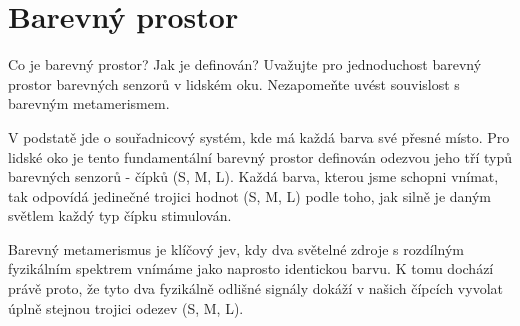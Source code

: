 \section{Barevný prostor}
Co je barevný prostor? Jak je definován? Uvažujte pro jednoduchost barevný prostor barevných senzorů v lidském 
oku. Nezapomeňte uvést souvislost s barevným metamerismem.

V podstatě jde o souřadnicový systém, kde má každá barva své přesné místo. Pro lidské oko je tento fundamentální barevný 
prostor definován odezvou jeho tří typů barevných senzorů - čípků (S, M, L). Každá barva, kterou jsme schopni vnímat, 
tak odpovídá jedinečné trojici hodnot (S, M, L) podle toho, jak silně je daným světlem každý typ čípku stimulován.

Barevný metamerismus je klíčový jev, kdy dva světelné zdroje s rozdílným fyzikálním spektrem vnímáme jako naprosto 
identickou barvu. K tomu dochází právě proto, že tyto dva fyzikálně odlišné signály dokáží v našich čípcích vyvolat 
úplně stejnou trojici odezev (S, M, L).